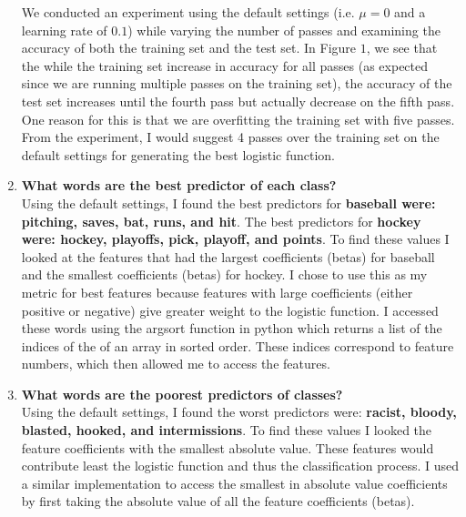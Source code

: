 \documentclass[110pt, oneside]{article}   	%
\begin{document}
\begin{enumerate}
We conducted an experiment using the default settings (i.e. $\mu=0$ and a learning rate of $0.1$) while varying the number of passes and examining the accuracy of both the training set and the test set.  In Figure $1$, we see that the while the training set increase in accuracy for all passes (as expected since we are running multiple passes on the training set), the accuracy of the test set increases until the fourth pass but actually decrease on the fifth pass.  One reason for this is that we are overfitting the training set with five passes.  From the experiment, I would suggest 4 passes over the training set on the default settings for generating the best logistic function.

\item \textbf{What words are the best predictor of each class?}\\
Using the default settings, I found the best predictors for \textbf{baseball were: pitching, saves, bat, runs, and hit}.  The best predictors for \textbf{hockey were: hockey, playoffs, pick, playoff, and points}.  To find these values I looked at the features that had the largest coefficients (betas) for baseball and the smallest coefficients (betas) for hockey.  I chose to use this as my metric for best features because features with large coefficients (either positive or negative) give greater weight to the logistic function.  I accessed these words using the argsort function in python which returns a list of the indices of the of an array in sorted order.  These indices correspond to feature numbers, which then allowed me to access the features.
\item \textbf{What words are the poorest predictors of classes?}\\
Using the default settings, I found the worst predictors were: \textbf{racist, bloody, blasted, hooked, and intermissions}.  To find these values I looked the feature coefficients with the smallest absolute value.  These features would contribute least the logistic function and thus the classification process.  I used a similar implementation to access the smallest in absolute value coefficients by first taking the absolute value of all the feature coefficients (betas).  
\end{enumerate}
\end{document}
